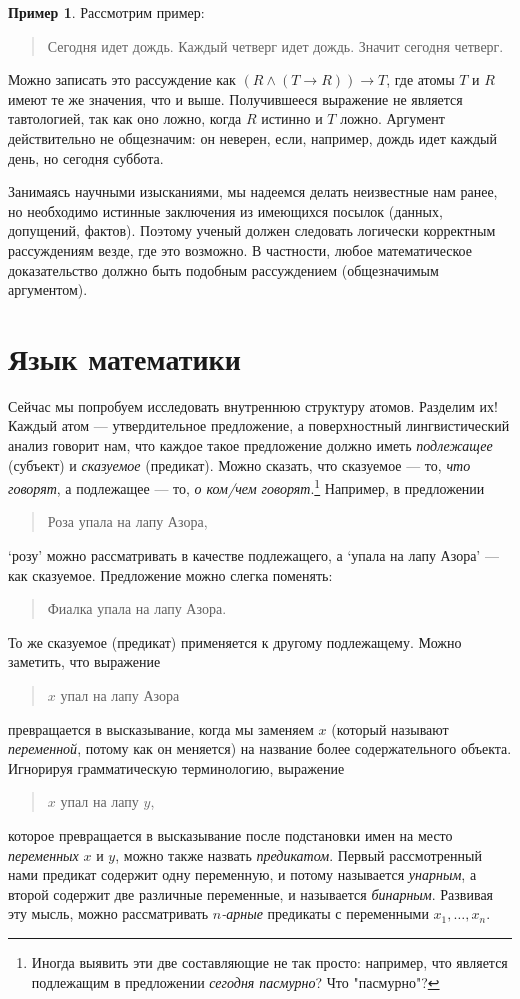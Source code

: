\documentclass[12pt,notitlepage]{article}
\theoremstyle{plain}
\theoremstyle{definition}
\newtheorem{exm}[thm]{Пример}
\theoremstyle{plain}
\newcommand{\1}{\mathbf{1}}
\newcommand{\0}{\mathbf{0}}
\newcommand{\mcomm}[1]{}
\begin{document}
\begin{exm}
	Рассмотрим пример:
	\begin{quote}
		Сегодня идет дождь. Каждый четверг идет дождь. Значит сегодня четверг.
	\end{quote}
	Можно записать это рассуждение как $(R \wedge (T \to R)) \to T$, где атомы $T$ и $R$ имеют те же значения, что и выше. Получившееся выражение не является тавтологией, так как оно ложно, когда $R$ истинно и $T$ ложно. Аргумент действительно не общезначим: он неверен, если, например, дождь идет каждый день, но сегодня суббота.
\end{exm}

Занимаясь научными изысканиями, мы надеемся делать неизвестные нам ранее, но необходимо истинные заключения из имеющихся посылок (данных, допущений, фактов). Поэтому ученый должен следовать логически корректным рассуждениям везде, где это возможно. В частности, любое математическое доказательство должно быть подобным рассуждением (общезначимым аргументом).

\section{Язык математики}
\mcomm{}

Сейчас мы попробуем исследовать внутреннюю структуру атомов. Разделим их! Каждый атом --- утвердительное предложение, а поверхностный лингвистический анализ говорит нам, что каждое такое предложение должно иметь \emph{подлежащее} (субъект) и \emph{сказуемое} (предикат). Можно сказать, что сказуемое --- то, \emph{что говорят}, а подлежащее --- то, \emph{о ком/чем говорят}.\footnote{Иногда выявить эти две составляющие не так просто: например, что является подлежащим в предложении \emph{сегодня пасмурно}? Что "пасмурно"?} Например, в предложении
\begin{quote}
	Роза упала на лапу Азора,
\end{quote}
`розу' можно рассматривать в качестве подлежащего, а `упала на лапу Азора' --- как сказуемое. Предложение можно слегка поменять:
\begin{quote}
	Фиалка упала на лапу Азора.
\end{quote}
То же сказуемое (предикат) применяется к другому подлежащему. Можно заметить, что выражение
\begin{quote}
	$x$ упал на лапу Азора
\end{quote}
превращается в высказывание, когда мы заменяем $x$ (который называют \emph{переменной}, потому как он меняется) на название более содержательного объекта. Игнорируя грамматическую терминологию, выражение
\begin{quote}
	$x$ упал на лапу $y$,
\end{quote}
которое превращается в высказывание после подстановки имен на место \emph{переменных} $x$ и $y$, можно также назвать \emph{предикатом}. Первый рассмотренный нами предикат содержит одну переменную, и потому называется \emph{унарным}, а второй содержит две различные переменные, и называется \emph{бинарным}. Развивая эту мысль, можно рассматривать \emph{$n$-арные} предикаты с переменными $x_1,\ldots,x_n$.
\end{document}
